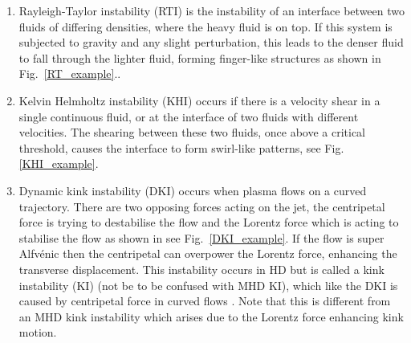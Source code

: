 \documentclass[12pt]{ociamthesis}
\newcommand{\Alfvenic}{Alfv\'{e}nic }
\begin{document}
\begin{enumerate}
    \item Rayleigh-Taylor instability (RTI) is the instability of an interface between two fluids of differing densities, where the heavy fluid is on top. If this system is subjected to gravity and any slight perturbation, this leads to the denser fluid to fall through the lighter fluid, forming finger-like structures as shown in Fig.~\ref{RT_example}..
    \item Kelvin Helmholtz instability (KHI) occurs if there is a velocity shear in a single continuous fluid, or at the interface of two fluids with different velocities. The shearing between these two fluids, once above a critical threshold, causes the interface to form swirl-like patterns, see Fig.\ref{KHI_example}.    
    \item Dynamic kink instability (DKI) occurs when plasma flows on a curved trajectory. There are two opposing forces acting on the jet, the centripetal force is trying to destabilise the flow and the Lorentz force which is acting to stabilise the flow as shown in see Fig.~\ref{DKI_example}. If the flow is super \Alfvenic then the centripetal can overpower the Lorentz force, enhancing the transverse displacement. This instability occurs in HD but is called a kink instability (KI) (not be to be confused with MHD KI), which like the DKI is caused by centripetal force in curved flows \citep{Drazin2002ihsbookD}. Note that this is different from an MHD kink instability which arises due to the Lorentz force enhancing kink motion.
\end{enumerate}
\end{document}
